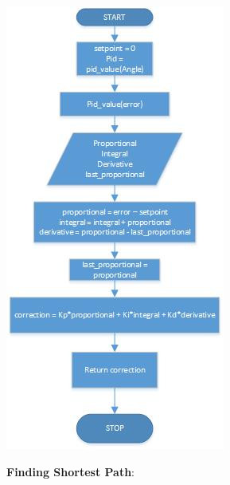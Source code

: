 \documentclass[report]{res}
\begin{document}
	\begin{center}
		\includegraphics[scale = 1.2]{graphics/drawing2.jpg}\\
	\end{center}
	
	\pagebreak
	
	
	\textbf{\Large Finding Shortest Path}:\\ \\
	
\end{document}
